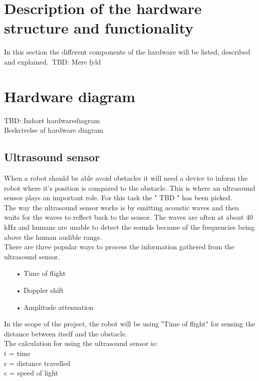 \section{Description of the hardware structure and functionality}

In this section the different components of the hardware will be listed, described and explained.\
TBD: Mere fyld

\section{Hardware diagram}
TBD: Indsæt hardwarediagram\\
Beskrivelse af hardware diagram\\

\subsection{Ultrasound sensor}
When a robot should be able avoid obstacles it will need a device to inform the robot where it's position is compared to the obstacle. This is where an ultrasound sensor plays an important role. For this task the " TBD " has been picked.\\

The way the ultrasound sensor works is by emitting acoustic waves and then waits for the waves to reflect back to the sensor. The waves are often at about 40 kHz and humans are unable to detect the sounds because of the frequencies being above the human audible range.\\


There are three popular ways to process the information gathered from the ultrasound sensor. \\

\begin{enumerate}
	\item[•]Time of flight
	\item[•]Doppler shift
	\item[•]Amplitude attenuation
\end{enumerate}

In the scope of the project, the robot will be using "Time of flight" for sensing the distance between itself and the obstacle.\\

The calculation for using the ultrasound sensor is: \\

t = time\\
r = distance travelled\\
c = speed of light\\

